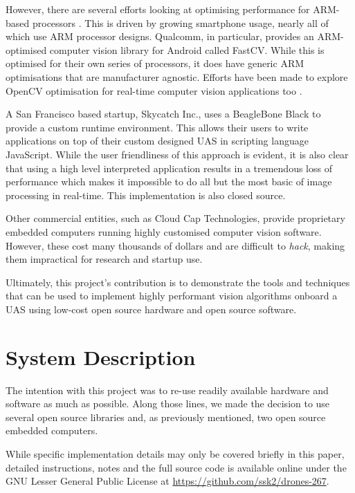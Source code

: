 \documentclass{acm_proc_article-sp}
\begin{document}
However, there are several efforts looking at optimising performance for ARM-based processors \cite{mitra2013use}. This is driven by growing smartphone usage, nearly all of which use ARM processor designs. Qualcomm, in particular, provides an ARM-optimised computer vision library for Android called FastCV. While this is optimised for their own series of processors, it does have generic ARM optimisations that are manufacturer agnostic. Efforts have been made to explore OpenCV optimisation for real-time computer vision applications too \cite{pulli2012real}.

A San Francisco based startup, Skycatch Inc., uses a BeagleBone Black to provide a custom runtime environment. This allows their users to write applications on top of their custom designed UAS in scripting language JavaScript. While the user friendliness of this approach is evident, it is also clear that using a high level interpreted application results in a tremendous loss of performance which makes it impossible to do all but the most basic of image processing in real-time. This implementation is also closed source. 

Other commercial entities, such as Cloud Cap Technologies, provide proprietary embedded computers running highly customised computer vision software. However, these cost many thousands of dollars and are difficult to \textit{hack}, making them impractical for research and startup use.

Ultimately, this project's contribution is to demonstrate the tools and techniques that can be used to implement highly performant vision algorithms onboard a UAS using low-cost open source hardware and open source software.

\section{System Description\label{sec:system-description}}
The intention with this project was to re-use readily available hardware and software as much as possible. Along those lines, we made the decision to use several open source libraries and, as previously mentioned, two open source embedded computers. 

While specific implementation details may only be covered briefly in this paper, detailed instructions, notes and the full source code is available online under the GNU Lesser General Public License at \url{https://github.com/ssk2/drones-267}.
\end{document}
